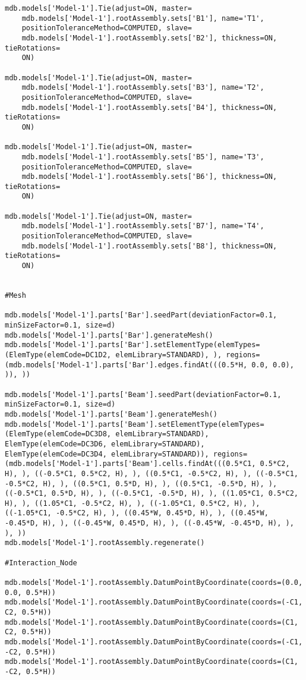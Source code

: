\documentclass[12pt, letterpaper, oneside]{report}
\begin{document}
\begin{lstlisting}[frame=none]
mdb.models['Model-1'].Tie(adjust=ON, master=
    mdb.models['Model-1'].rootAssembly.sets['B1'], name='T1', 
    positionToleranceMethod=COMPUTED, slave=
    mdb.models['Model-1'].rootAssembly.sets['B2'], thickness=ON, tieRotations=
    ON)

mdb.models['Model-1'].Tie(adjust=ON, master=
    mdb.models['Model-1'].rootAssembly.sets['B3'], name='T2', 
    positionToleranceMethod=COMPUTED, slave=
    mdb.models['Model-1'].rootAssembly.sets['B4'], thickness=ON, tieRotations=
    ON)

mdb.models['Model-1'].Tie(adjust=ON, master=
    mdb.models['Model-1'].rootAssembly.sets['B5'], name='T3', 
    positionToleranceMethod=COMPUTED, slave=
    mdb.models['Model-1'].rootAssembly.sets['B6'], thickness=ON, tieRotations=
    ON)

mdb.models['Model-1'].Tie(adjust=ON, master=
    mdb.models['Model-1'].rootAssembly.sets['B7'], name='T4', 
    positionToleranceMethod=COMPUTED, slave=
    mdb.models['Model-1'].rootAssembly.sets['B8'], thickness=ON, tieRotations=
    ON)
    
    
#Mesh

mdb.models['Model-1'].parts['Bar'].seedPart(deviationFactor=0.1, minSizeFactor=0.1, size=d)
mdb.models['Model-1'].parts['Bar'].generateMesh()
mdb.models['Model-1'].parts['Bar'].setElementType(elemTypes=(ElemType(elemCode=DC1D2, elemLibrary=STANDARD), ), regions=(mdb.models['Model-1'].parts['Bar'].edges.findAt(((0.5*H, 0.0, 0.0), )), ))

mdb.models['Model-1'].parts['Beam'].seedPart(deviationFactor=0.1, minSizeFactor=0.1, size=d)
mdb.models['Model-1'].parts['Beam'].generateMesh()
mdb.models['Model-1'].parts['Beam'].setElementType(elemTypes=(ElemType(elemCode=DC3D8, elemLibrary=STANDARD), ElemType(elemCode=DC3D6, elemLibrary=STANDARD), ElemType(elemCode=DC3D4, elemLibrary=STANDARD)), regions=(mdb.models['Model-1'].parts['Beam'].cells.findAt(((0.5*C1, 0.5*C2, H), ), ((-0.5*C1, 0.5*C2, H), ), ((0.5*C1, -0.5*C2, H), ), ((-0.5*C1, -0.5*C2, H), ), ((0.5*C1, 0.5*D, H), ), ((0.5*C1, -0.5*D, H), ), ((-0.5*C1, 0.5*D, H), ), ((-0.5*C1, -0.5*D, H), ), ((1.05*C1, 0.5*C2, H), ), ((1.05*C1, -0.5*C2, H), ), ((-1.05*C1, 0.5*C2, H), ), ((-1.05*C1, -0.5*C2, H), ), ((0.45*W, 0.45*D, H), ), ((0.45*W, -0.45*D, H), ), ((-0.45*W, 0.45*D, H), ), ((-0.45*W, -0.45*D, H), ), ), ))
mdb.models['Model-1'].rootAssembly.regenerate()

#Interaction_Node

mdb.models['Model-1'].rootAssembly.DatumPointByCoordinate(coords=(0.0, 0.0, 0.5*H))
mdb.models['Model-1'].rootAssembly.DatumPointByCoordinate(coords=(-C1, C2, 0.5*H))
mdb.models['Model-1'].rootAssembly.DatumPointByCoordinate(coords=(C1, C2, 0.5*H))
mdb.models['Model-1'].rootAssembly.DatumPointByCoordinate(coords=(-C1, -C2, 0.5*H))
mdb.models['Model-1'].rootAssembly.DatumPointByCoordinate(coords=(C1, -C2, 0.5*H))


\end{lstlisting}
\end{document}
